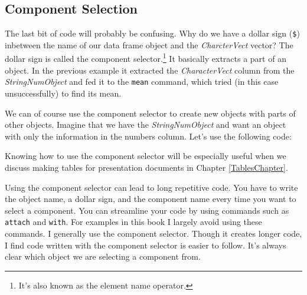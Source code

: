 \subsection{Component Selection}

The last bit of code will probably be confusing. Why do we have a dollar sign (\texttt{\$}) inbetween the name of our data frame object and the {\emph{CharcterVect}} vector? The dollar sign is called the component selector.\footnote{It's also known as the element name operator.} It basically extracts a part of an object. In the previous example it extracted the {\emph{CharacterVect}} column from the {\emph{StringNumObject}} and fed it to the \texttt{mean} command, which tried (in this case unsuccessfully) to find its mean.

We can of course use the component selector to create new objects with parts of other objects. Imagine that we have the {\emph{StringNumObject}} and want an object with only the information in the numbers column. Let's use the following code:

\begin{knitrout}
\color{fgcolor}
\end{knitrout}


\noindent Knowing how to use the component selector will be especially useful when we discuss making tables for presentation documents in Chapter \ref{TablesChapter}.

Using the component selector can lead to long repetitive code. You have to write the object name, a dollar sign, and the component name every time you want to select a component. You can streamline your code by using commands such as \texttt{attach} and \texttt{with}. For examples in this book I largely avoid using these commands. I generally use the component selector. Though it creates longer code, I find code written with the component selector is easier to follow. It's always clear which object we are selecting a component from. 

